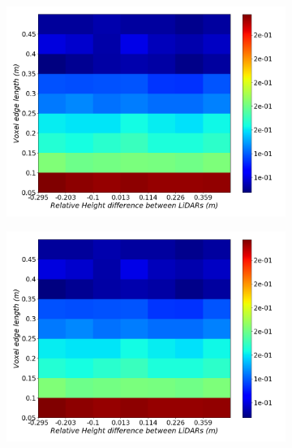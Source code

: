 \begin{figure}[!ht]
\centering
\begin{subfigure}[c]{0.45\textwidth}
	\includegraphics[width=\textwidth]{img/lidar-interference/height/octree_interference_color_mesh.png}
\caption{}%
	\label{fig:height:octree-interference-color-mesh}
\end{subfigure}
\qquad
\begin{subfigure}[c]{0.45\textwidth}
	\includegraphics[width=\textwidth]{img/lidar-interference/height/octree_ground_truth_color_mesh.png}
\caption{}%

\end{subfigure}
\end{figure}
